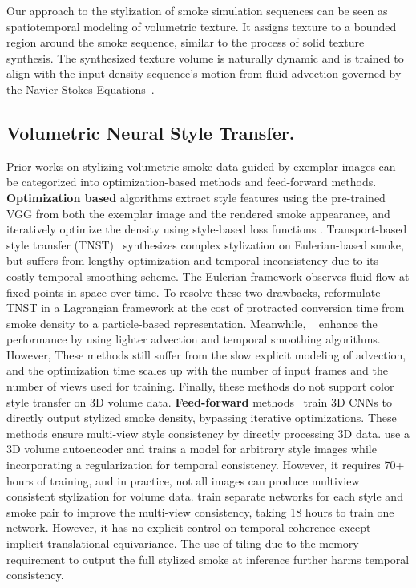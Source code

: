 Our approach to the stylization of smoke simulation sequences can be seen as spatiotemporal modeling of volumetric texture. 
It assigns texture to a bounded region around the smoke sequence, similar to the process of solid texture synthesis.
The synthesized texture volume is naturally dynamic and is trained to align with the input density sequence's motion from fluid advection governed by the Navier-Stokes Equations~\cite{bridson2015fluid}. 


\subsection{Volumetric Neural Style Transfer.}
Prior works on stylizing volumetric smoke data guided by exemplar images can be categorized into optimization-based methods and feed-forward methods. 
\textbf{Optimization based} algorithms \cite{kim19c, kimlnst, aurand2022efficient} extract style features using the pre-trained VGG \cite{vgg16} from both the exemplar image and the rendered smoke appearance, and iteratively optimize the density using style-based loss functions \cite{gatys2016image}. 
Transport-based style transfer (TNST)~\cite{kim19c} synthesizes complex stylization on Eulerian-based smoke, but suffers from lengthy optimization and temporal inconsistency due to its costly temporal smoothing scheme. 
The Eulerian framework observes fluid flow at fixed points in space over time.
To resolve these two drawbacks, \citet{kimlnst} reformulate TNST in a Lagrangian framework at the cost of protracted conversion time from smoke density to a particle-based representation.
Meanwhile, ~\citet{aurand2022efficient} enhance the performance by using lighter advection and temporal smoothing algorithms. 
However, These methods still suffer from the slow explicit modeling of advection, and the optimization time scales up with the number of input frames and the number of views used for training. 
Finally, these methods do not support color style transfer on 3D volume data. 
\textbf{Feed-forward} methods~\cite{guo2021volumetric, aurand2022efficient} train 3D CNNs to directly output stylized smoke density, bypassing iterative optimizations. 
These methods ensure multi-view style consistency by directly processing 3D data.
\citet{guo2021volumetric} use a 3D volume autoencoder and trains a model for arbitrary style images while incorporating a regularization for temporal consistency. 
However, it requires 70+ hours of training, and in practice, not all images can produce multiview consistent stylization for volume data.
\citet{aurand2022efficient} train separate networks for each style and smoke pair to improve the multi-view consistency, taking 18 hours to train one network. 
However, it has no explicit control on temporal coherence except implicit translational equivariance. The use of tiling due to the memory requirement to output the full stylized smoke at inference further harms temporal consistency.  

